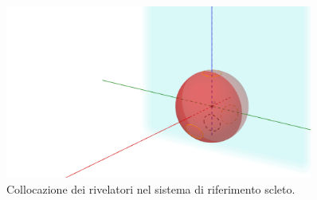 \begin{figure}[h]\centering\includegraphics[width=0.9\textwidth]{../../img/sfera_sdr.png}\caption{Collocazione dei rivelatori nel sistema di riferimento scleto. }\label{fig:sfera_sdr}\end{figure}
